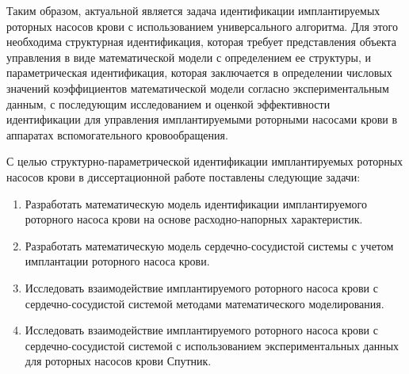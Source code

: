 Таким образом, актуальной является задача идентификации имплантируемых роторных насосов крови с использованием универсального алгоритма. Для этого необходима структурная идентификация, которая требует представления объекта управления  в виде математической модели с определением ее структуры, и параметрическая идентификация, которая заключается в определении числовых значений коэффициентов математической модели согласно экспериментальным данным, с последующим исследованием и оценкой эффективности идентификации для управления имплантируемыми роторными насосами крови в аппаратах вспомогательного кровообращения.

С целью структурно-параметрической идентификации имплантируемых роторных насосов крови в диссертационной работе поставлены следующие задачи:

\begin{enumerate}
  \item Разработать математическую модель идентификации имплантируемого роторного насоса крови на основе расходно-напорных характеристик.
  \item Разработать математическую модель сердечно-сосудистой системы с учетом имплантации роторного насоса крови.
  \item Исследовать взаимодействие имплантируемого роторного насоса крови с сердечно-сосудистой системой методами математического моделирования.
  \item Исследовать взаимодействие имплантируемого роторного насоса крови с сердечно-сосудистой системой с использованием экспериментальных данных для роторных насосов крови Спутник.
\end{enumerate}

% 
% 
% 

